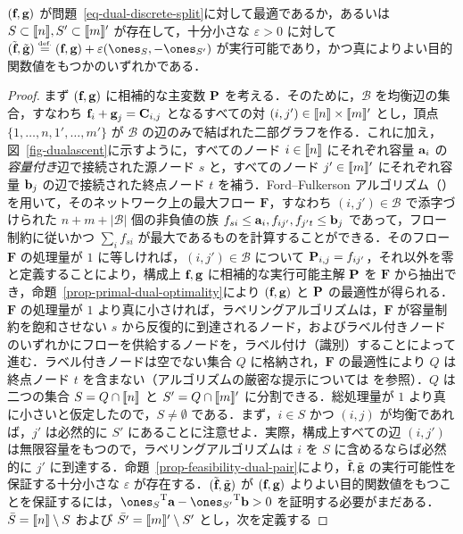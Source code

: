 \begin{prop}\label{prop-dual-ascent-dir} $(\fD,\gD)$ が問題~\eqref{eq-dual-discrete-split}に対して最適であるか，あるいは $S\subset\range{n},S'\subset\range{m}'$ が存在して，十分小さな $\varepsilon>0$ に対して $(\tilde{\fD},\tilde{\gD})\eqdef(\fD,\gD)+\varepsilon(\ones_S,-\ones_{S'})$ が実行可能であり，かつ真によりよい目的関数値をもつかのいずれかである．
\end{prop}
\begin{proof}
まず $(\fD,\gD)$ に相補的な主変数 $\P$ を考える．そのために，$\mathcal{B}$ を均衡辺の集合，すなわち $\fD_i+\gD_j=\C_{i,j}$ となるすべての対 $(i,j')\in\range{n}\times\range{m}'$ とし，頂点 $\{1,\dots,n,1',\dots,m'\}$ が $\mathcal{B}$ の辺のみで結ばれた二部グラフを作る．これに加え，図~\ref{fig-dualascent}に示すように，すべてのノード $i\in\range{n}$ にそれぞれ容量 $\a_i$ の\emph{容量付き}辺で接続された源ノード $s$ と，すべてのノード $j'\in\range{m}'$ にそれぞれ容量 $\b_j$ の辺で接続された終点ノード $t$ を補う．Ford--Fulkerson アルゴリズム（\cite[p. 305]{bertsimas1997introduction}）を用いて，そのネットワーク上の最大フロー $\mathbf{F}$，すなわち $(i,j')\in \mathcal{B}$ で添字づけられた $n+m+|\mathcal{B}|$ 個の非負値の族 $f_{si}\leq \a_i, f_{ij'}, f_{j't}\leq\b_j$ であって，フロー制約に従いかつ $\sum_i f_{si}$ が最大であるものを計算することができる．そのフロー $\mathbf{F}$ の処理量が $1$ に等しければ，$(i,j')\in \mathcal{B}$ について $\P_{i,j}=f_{ij'}$，それ以外を零と定義することにより，構成上 $\fD,\gD$ に相補的な実行可能主解 $\P$ を $\mathbf{F}$ から抽出でき，命題~\ref{prop-primal-dual-optimality}により $(\fD,\gD)$ と $\P$ の最適性が得られる．$\mathbf{F}$ の処理量が $1$ より真に小さければ，ラベリングアルゴリズムは，$\mathbf{F}$ が容量制約を飽和させない $s$ から反復的に到達されるノード，およびラベル付きノードのいずれかにフローを供給するノードを，ラベル付け（識別）することによって進む．ラベル付きノードは空でない集合 $Q$ に格納され，$\mathbf{F}$ の最適性により $Q$ は終点ノード $t$ を含まない（アルゴリズムの厳密な提示については \citealt[p. 308]{bertsimas1997introduction} を参照）．$Q$ は二つの集合 $S=Q\cap\range{n}$ と $S'=Q\cap\range{m}'$ に分割できる．総処理量が $1$ より真に小さいと仮定したので，$S\ne\emptyset$ である．まず，$i\in S$ かつ $(i,j)$ が均衡であれば，$j'$ は必然的に $S'$ にあることに注意せよ．実際，構成上すべての辺 $(i,j')$ は無限容量をもつので，ラベリングアルゴリズムは $i$ を $S$ に含めるならば必然的に $j'$ に到達する．命題~\ref{prop-feasibility-dual-pair}により，$\tilde{\fD},\tilde{\gD}$ の実行可能性を保証する十分小さな $\varepsilon$ が存在する．$(\tilde{\fD},\tilde{\gD})$ が $(\fD,\gD)$ よりよい目的関数値をもつことを保証するには，$\transp{\ones_S}{\a}-\transp{\ones_{S'}}{\b}>0$ を証明する必要がまだある．$\bar{S}=\range{n}\setminus S$ および $\bar{S'}=\range{m}'\setminus S'$ とし，次を定義する

\end{proof}
